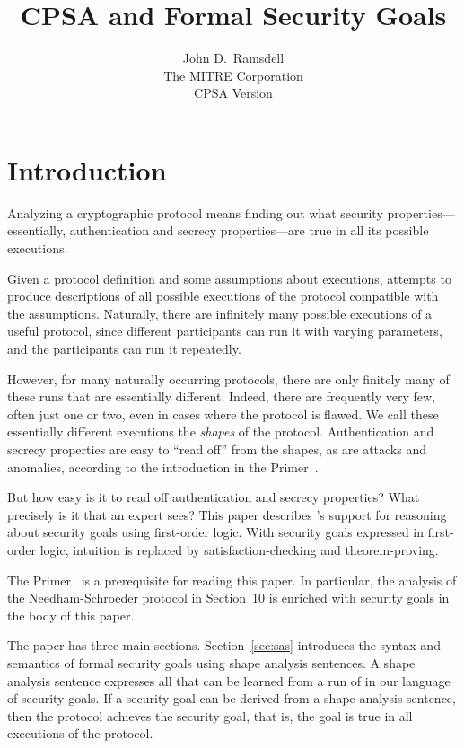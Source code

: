 \documentclass[12pt]{article}
\title{CPSA and Formal Security Goals}
\author{John D.~Ramsdell\\
  The MITRE Corporation\\ CPSA Version \version}
\begin{document}
\maketitle
\cpsacopying

\tableofcontents

\listoffigures

\listoftables

\newpage

\section{Introduction}

\begin{sloppypar}
Analyzing a cryptographic protocol means finding out what security
properties---essentially, authentication and secrecy properties---are
true in all its possible executions.
\end{sloppypar}

Given a protocol definition and some assumptions about executions,
{\cpsa} attempts to produce descriptions of all possible executions of
the protocol compatible with the assumptions.  Naturally, there are
infinitely many possible executions of a useful protocol, since
different participants can run it with varying parameters, and the
participants can run it repeatedly.

However, for many naturally occurring protocols, there are only
finitely many of these runs that are essentially different.  Indeed,
there are frequently very few, often just one or two, even in cases
where the protocol is flawed.  We call these essentially different
executions the \emph{shapes} of the protocol.  Authentication and
secrecy properties are easy to ``read off'' from the shapes, as are
attacks and anomalies, according to the introduction in the {\cpsa}
Primer~\cite{cpsaprimer09}.

But how easy is it to read off authentication and secrecy properties?
What precisely is it that an expert sees?  This paper describes
{\cpsa}'s support for reasoning about security goals using first-order
logic.  With security goals expressed in first-order logic, intuition
is replaced by satisfaction-checking and theorem-proving.

The {\cpsa} Primer~\cite{cpsaprimer09} is a prerequisite for reading
this paper.  In particular, the analysis of the Needham-Schroeder
protocol in Section~10 is enriched with security goals in the body of
this paper.

The paper has three main sections.  Section~\ref{sec:sas} introduces
the syntax and semantics of formal security goals using shape analysis
sentences.  A shape analysis sentence expresses all that can be
learned from a run of {\cpsa} in our language of security goals.  If a
security goal can be derived from a shape analysis sentence, then the
protocol achieves the security goal, that is, the goal is true in all
executions of the protocol.
\end{document}
